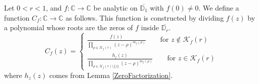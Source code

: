 \begin{definition}[CFunction]
\label{CFunction}
\leanok
Let $0 < r < 1$, and $f:\mathbb{C}\to\mathbb{C}$ be analytic on $\overline{\mathbb{D}_1}$ with
    $f(0)\neq 0$. We define a function $C_f:\mathbb{C}\to\mathbb{C}$ as follows. This function is
    constructed by dividing $f(z)$ by a polynomial whose roots are the zeros of $f$ inside
    $\overline{\mathbb{D}_r}$.
    $$C_f(z)=\begin{cases}
        \displaystyle\frac{f(z)}{\prod_{\rho\in\mathcal{K}_f(r)}(z-\rho)^{m_f(\rho)}}
          \qquad\text{for }z\not\in\mathcal{K}_f(r) \\
        \displaystyle\frac{h_z(z)}{\prod_{\rho\in\mathcal{K}_f(r)\setminus\{z\}}
          (z-\rho)^{m_f(\rho)}}\qquad\text{for }z\in\mathcal{K}_f(r)
    \end{cases}$$
    where $h_z(z)$ comes from Lemma \ref{ZeroFactorization}.
\end{definition}
